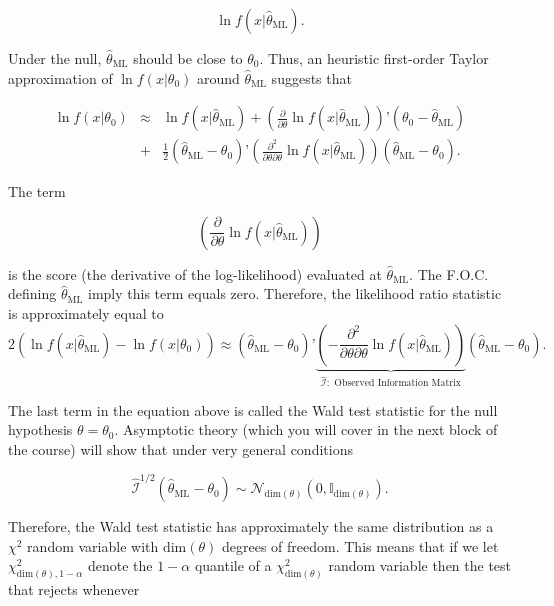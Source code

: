 \documentclass[11pt]{article} %
\begin{document}
\[ \ln f( x | \widehat{\theta}_{\textrm{ML}}).\]

\noindent Under the null, $\widehat{\theta}_{\textrm{ML}}$ should be close to $\theta_0$. Thus, an heuristic first-order Taylor approximation of $\ln f(x|\theta_0)$ around $\widehat{\theta}_{\textrm{ML}}$ suggests that

\begin{eqnarray*}
 \ln f(x| \theta_0) &\approx& \ln f( x | \widehat{\theta}_{\textrm{ML}}) + \left( \frac{\partial}{\partial \theta} \ln f( x | \widehat{\theta}_{\textrm{ML}})\right )’ (\theta_0-\widehat{\theta}_{\textrm{ML}}) \\
&+& \frac{1}{2} (\widehat{\theta}_{\textrm{ML}}-\theta_0)’  \left( \frac{\partial^2}{\partial \theta \partial \theta} \ln f( x | \widehat{\theta}_{\textrm{ML}})\right ) (\widehat{\theta}_{\textrm{ML}}-\theta_0). 
\end{eqnarray*}

\noindent The term

\[ \left( \frac{\partial}{\partial \theta} \ln f( x | \widehat{\theta}_{\textrm{ML}})\right ) \] 

\noindent is the score (the derivative of the log-likelihood) evaluated at $\widehat{\theta}_{\textrm{ML}}$. The F.O.C. defining $\widehat{\theta}_{\textrm{ML}}$ imply this term equals zero. Therefore, the likelihood ratio statistic is approximately equal to
\[2(\ln f( x | \widehat{\theta}_{\textrm{ML}}) - \ln f(x| \theta_0)) \approx (\widehat{\theta}_{\textrm{ML}}-\theta_0)’  \underbrace{\left( -\frac{\partial^2}{\partial \theta \partial \theta} \ln f( x | \widehat{\theta}_{\textrm{ML}})\right )}_{\widehat{\mathcal{I}}: \textrm{ Observed Information Matrix}}  (\widehat{\theta}_{\textrm{ML}}-\theta_0).    \]

\noindent The last term in the equation above is called the Wald test statistic for the null hypothesis $\theta = \theta_0$. Asymptotic theory (which you will cover in the next block of the course) will show that under very general conditions 

\[ \widehat{\mathcal{I}}^{1/2}(\widehat{\theta}_{\textrm{ML}}-\theta_0) \sim \mathcal{N}_{\textrm{dim}(\theta)} (0, \mathbb{I}_{\textrm{dim}(\theta)}).\]

\noindent Therefore, the Wald test statistic has approximately the same distribution as a $\chi^2$ random variable with $\textrm{dim}(\theta)$ degrees of freedom. This means that if we let $\chi^2_{\textrm{dim}(\theta),1-\alpha}$ denote the $1-\alpha$ quantile of a $\chi^2_{\textrm{dim}(\theta)}$ random variable then the test that rejects whenever
\end{document}
